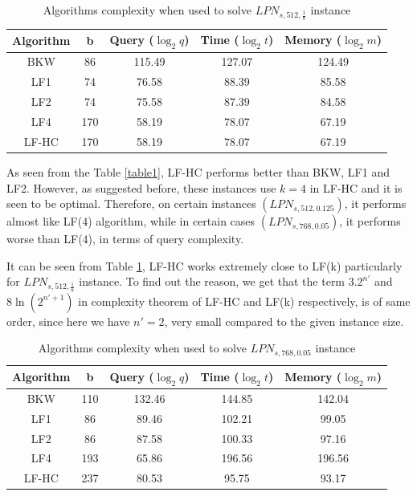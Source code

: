 \documentclass{article}
\begin{document}
 
 \begin{table}
 	\begin{center}
 		\begin{tabular}{|c||c|c|c|c|}
 			\hline
 			Algorithm & b & Query ($\log_2q$) & Time ($\log_2t$) & Memory ($\log_2m$)\\
 			\hline
 			BKW & 86 & 115.49 & 127.07 & 124.49\\
 			LF1 & 74 & 76.58 & 88.39 & 85.58\\
 			LF2 & 74 & 75.58 & 87.39 & 84.58\\
 			LF4 & 170 & 58.19 & 78.07 & 67.19\\
 			LF-HC & 170 & 58.19 & 78.07 & 67.19\\
 			\hline 
 		\end{tabular}
 	\caption{Algorithms complexity when used to solve $LPN_{s,512,\frac{1}{8}}$ instance}
 	\label{table2}
 	\end{center}
 \end{table}
 
 As seen from the Table \ref{table1}, LF-HC performs better than BKW, LF1 and LF2. However, as suggested before, these instances use $k=4$ in LF-HC and it is seen to be optimal. Therefore, on certain instances $(LPN_{s,512,0.125})$, it performs almost like LF(4) algorithm, while in certain cases $(LPN_{s,768,0.05})$, it performs worse than LF(4), in terms of query complexity.
 
 It can be seen from Table \ref{table2}, LF-HC works extremely close to LF(k) particularly for $LPN_{s,512,\frac{1}{8}}$ instance. To find out the reason, we get that the term $3.2^{n'}$ and $8\ln(2^{n'+1})$ in complexity theorem of LF-HC and LF(k) respectively, is of same order, since here we have $n'=2$, very small compared to the given instance size. 
 
 \begin{table}
 	\begin{center}
 		\begin{tabular}{|c||c|c|c|c|}
 			\hline
 			Algorithm & b & Query ($\log_2q$) & Time ($\log_2t$) & Memory ($\log_2m$)\\
 			\hline
 			BKW & 110 & 132.46 & 144.85 & 142.04\\
 			LF1 & 86 & 89.46 & 102.21 & 99.05\\
 			LF2 & 86 & 87.58 & 100.33 & 97.16\\
 			LF4 & 193 & 65.86 & 196.56 & 196.56\\
 			LF-HC & 237 & 80.53 & 95.75 & 93.17\\
 			\hline 
 		\end{tabular}
 		\caption{Algorithms complexity when used to solve $LPN_{s,768,0.05}$ instance}
 		\label{table3}
 	\end{center}
 \end{table}
\end{document}

